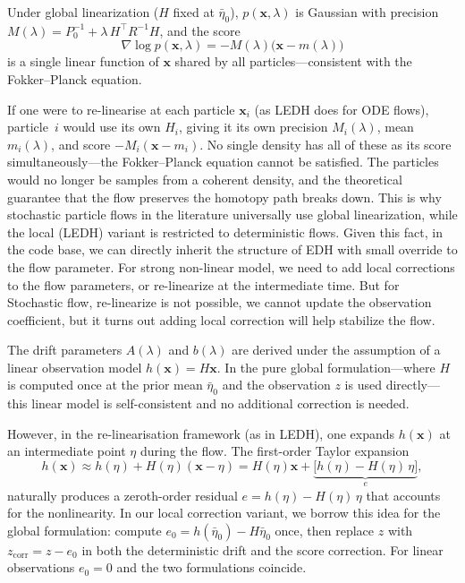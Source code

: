 \documentclass{article}
\renewcommand{\v}[1]{ \ensuremath{ {\mathbf{#1}} }}
\begin{document}
Under global linearization ($H$ fixed at $\bar\eta_0$), $p(\v{x},\lambda)$ is Gaussian with precision $M(\lambda) = P_0^{-1} + \lambda\,H^\top R^{-1}H$, and the score
\[
  \nabla\log p(\v{x},\lambda) = -M(\lambda)\bigl(\v{x} - m(\lambda)\bigr)
\]
is a single linear function of $\v{x}$ shared by all particles---consistent with the Fokker--Planck equation.

If one were to re-linearise at each particle $\v{x}_i$ (as LEDH does for ODE flows), particle~$i$ would use its own $H_i$, giving it its own precision $M_i(\lambda)$, mean $m_i(\lambda)$, and score $-M_i(\v{x} - m_i)$. No single density has all of these as its score simultaneously---the Fokker--Planck equation cannot be satisfied. The particles would no longer be samples from a coherent density, and the theoretical guarantee that the flow preserves the homotopy path breaks down. This is why stochastic particle flows in the literature universally use global linearization, while the local (LEDH) variant is restricted to deterministic flows. Given this fact, in the code base, we can directly inherit the structure of EDH with small override to the flow parameter. For strong non-linear model, we need to add local corrections to the flow parameters, or re-linearize at the intermediate time. But for Stochastic flow, re-linearize is not possible, we cannot update the observation coefficient, but it turns out adding local correction will help stabilize the flow. 

The drift parameters $A(\lambda)$ and $b(\lambda)$ are derived under the assumption of a linear observation model $h(\v{x}) = H\v{x}$. In the pure global formulation---where $H$ is computed once at the prior mean $\bar\eta_0$ and the observation $z$ is used directly---this linear model is self-consistent and no additional correction is needed.

However, in the re-linearisation framework (as in LEDH), one expands $h(\v{x})$ at an intermediate point $\eta$ during the flow. The first-order Taylor expansion
\[
  h(\v{x}) \approx h(\eta) + H(\eta)(\v{x} - \eta) = H(\eta)\v{x} + \underbrace{\bigl[h(\eta) - H(\eta)\,\eta\bigr]}_{e},
\]
naturally produces a zeroth-order residual $e = h(\eta) - H(\eta)\,\eta$ that accounts for the nonlinearity. In our local correction variant, we borrow this idea for the global formulation: compute $e_0 = h(\bar\eta_0) - H\bar\eta_0$ once, then replace $z$ with $z_{\mathrm{corr}} = z - e_0$ in both the deterministic drift and the score correction. For linear observations $e_0 = 0$ and the two formulations coincide.
\end{document}
